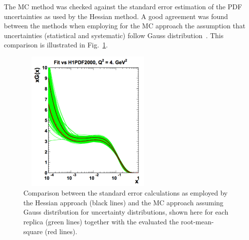 \begin{description}
The MC method was checked against the standard error estimation of the PDF uncertainties as used by the Hessian method. 
A good agreement was found between the methods when employing for the MC approach the assumption that uncertainties 
(statistical and systematic) follow Gauss distribution~\cite{hera-lhc:report2009}. 
This comparison is illustrated in Fig.~\ref{fig:mchessian}.
\begin{figure}[!ht]
 \centering
  \includegraphics[width=7cm,height=7cm]{mchessian.pdf}
  \caption{Comparison between the standard error calculations as employed by the Hessian approach (black lines) 
      and the MC approach assuming Gauss distribution for uncertainty distributions, shown here for each replica 
          (green lines) together with the evaluated the root-mean-square (red lines).}
  \label{fig:mchessian}        
\end{figure}
\end{description}

